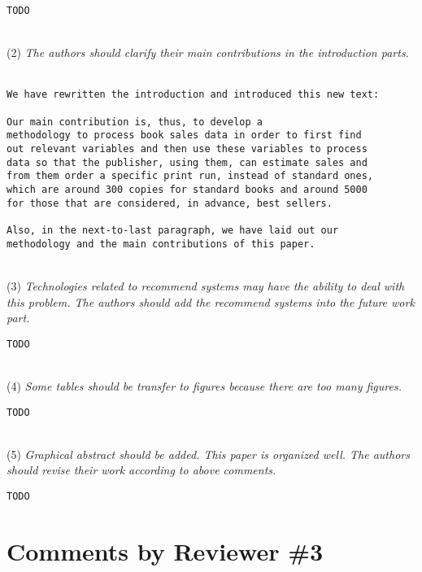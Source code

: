 \documentclass[preprint]{elsarticle}
\begin{document}
\begin{verbatim}
TODO
\end{verbatim}

~\\
\noindent (2) \emph{The authors should clarify their main contributions in the introduction parts. } 

\begin{verbatim}
We have rewritten the introduction and introduced this new text:

Our main contribution is, thus, to develop a
methodology to process book sales data in order to first find 
out relevant variables and then use these variables to process 
data so that the publisher, using them, can estimate sales and 
from them order a specific print run, instead of standard ones, 
which are around 300 copies for standard books and around 5000 
for those that are considered, in advance, best sellers.

Also, in the next-to-last paragraph, we have laid out our 
methodology and the main contributions of this paper.
\end{verbatim}

~\\
\noindent (3) \emph{Technologies related to recommend systems may have the ability to deal with this problem. The authors should add the recommend systems into the future work part. } 

\begin{verbatim}
TODO
\end{verbatim}

~\\
\noindent (4) \emph{Some tables should be transfer to figures because there are too many figures. } 

\begin{verbatim}
TODO
\end{verbatim}

~\\
\noindent (5) \emph{Graphical abstract should be added. This paper is organized well. The authors should revise their work according to above comments. } 

\begin{verbatim}
TODO
\end{verbatim}



\section{Comments by Reviewer \#3}
\end{document}
